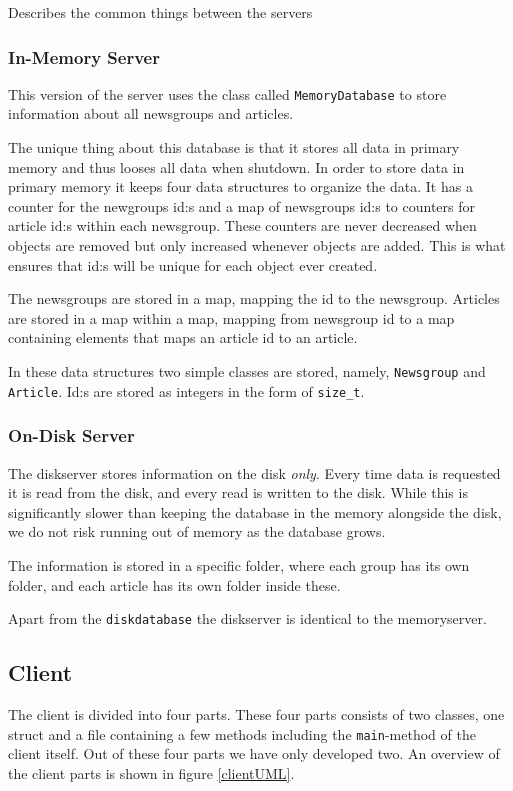 \documentclass[a4paper]{article}
\begin{document}
Describes the common things between the servers

\subsubsection{In-Memory Server}

This version of the server uses the class called \texttt{MemoryDatabase} to store information about all newsgroups and articles.

The unique thing about this database is that it stores all data in primary memory and thus looses all data when shutdown. In order to store data in primary memory it keeps four data structures to organize the data. It has a counter for the newgroups id:s and a map of newsgroups id:s to counters for article id:s within each newsgroup. These counters are never decreased when objects are removed but only increased whenever objects are added. This is what ensures that id:s will be unique for each object ever created.

The newsgroups are stored in a map, mapping the id to the newsgroup. Articles are stored in a map within a map, mapping from newsgroup id to a map containing elements that maps an article id to an article.

In these data structures two simple classes are stored, namely, \texttt{Newsgroup} and \texttt{Article}. Id:s are stored as integers in the form of \texttt{size\_t}.


\subsubsection{On-Disk Server}
The diskserver stores information on the disk \emph{only}. Every time data is requested it is read from the disk, and every read is written to the disk. While this is significantly slower than keeping the database in the memory alongside the disk, we do not risk running out of memory as the database grows.

The information is stored in a specific folder, where each group has its own folder, and each article has its own folder inside these.

Apart from the \texttt{diskdatabase} the diskserver is identical to the memoryserver. 


\subsection{Client}
The client is divided into four parts. These four parts consists of two classes, one struct and a file containing a few methods including the \texttt{main}-method of the client itself. Out of these four parts we have only developed two. An overview of the client parts is shown in figure \ref{clientUML}.
\end{document}
